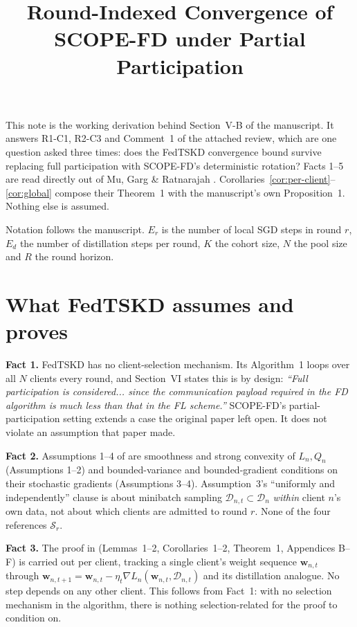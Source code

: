 \documentclass[11pt]{article}
\title{Round-Indexed Convergence of SCOPE-FD under Partial Participation}
\author{}
\date{}
\begin{document}
\maketitle
\vspace{-3em}

This note is the working derivation behind Section~V-B of the manuscript. It
answers R1-C1, R2-C3 and Comment~1 of the attached review, which are one
question asked three times: does the FedTSKD convergence bound survive
replacing full participation with SCOPE-FD's deterministic rotation? Facts
1--5 are read directly out of Mu, Garg \& Ratnarajah \cite{mu2024fedtskd}.
Corollaries~\ref{cor:per-client}--\ref{cor:global} compose their Theorem~1
with the manuscript's own Proposition~1. Nothing else is assumed.

Notation follows the manuscript. $E_r$ is the number of local SGD steps in
round $r$, $E_d$ the number of distillation steps per round, $K$ the cohort
size, $N$ the pool size and $R$ the round horizon.

\section{What FedTSKD assumes and proves}
\label{sec:facts}

\textbf{Fact 1.} FedTSKD has no client-selection mechanism. Its Algorithm~1
loops over all $N$ clients every round, and Section~VI states this is by
design: \emph{``Full participation is considered... since the communication
payload required in the FD algorithm is much less than that in the FL
scheme.''} SCOPE-FD's partial-participation setting extends a case the
original paper left open. It does not violate an assumption that paper made.

\textbf{Fact 2.} Assumptions 1--4 of \cite{mu2024fedtskd} are smoothness and
strong convexity of $L_n,Q_n$ (Assumptions 1--2) and bounded-variance and
bounded-gradient conditions on their stochastic gradients (Assumptions 3--4).
Assumption~3's ``uniformly and independently'' clause is about minibatch
sampling $\mathcal{D}_{n,t}\subset\mathcal{D}_n$ \emph{within} client $n$'s
own data, not about which clients are admitted to round $r$. None of the four
references $\mathcal{S}_r$.

\textbf{Fact 3.} The proof in \cite{mu2024fedtskd} (Lemmas~1--2,
Corollaries~1--2, Theorem~1, Appendices B--F) is carried out per client,
tracking a single client's weight sequence $\bm w_{n,t}$ through
$\bm w_{n,t+1} = \bm w_{n,t} - \eta_t \nabla L_n(\bm w_{n,t},\mathcal{D}_{n,t})$
and its distillation analogue. No step depends on any other client. This
follows from Fact~1: with no selection mechanism in the algorithm, there is
nothing selection-related for the proof to condition on.
\end{document}
